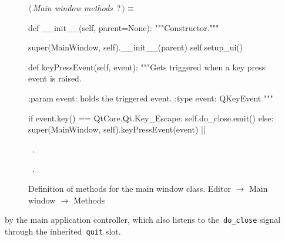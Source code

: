 \documentclass[%
    a4paper,    %
    justified,  %
    nobib,      %
    openany     %
]{tufte-book}
\begin{document}
\begin{figure}
\begin{flushleft} \small
\begin{minipage}{\linewidth}\label{scrap17}\raggedright\small
{} $\langle\,${\itshape Main window methods}\nobreak\ {\footnotesize {?}}$\,\rangle\equiv$
\vspace{-1ex}
\begin{pythoncode}
def __init__(self, parent=None):
    """Constructor."""

    super(MainWindow, self).__init__(parent)
    self.setup_ui()

def keyPressEvent(self, event):
    """Gets triggered when a key press event is raised.

    :param event: holds the triggered event.
    :type  event: QKeyEvent
    """

    if event.key() == QtCore.Qt.Key_Escape:
        self.do_close.emit()
    else:
        super(MainWindow, self).keyPressEvent(event)
|\NWsep|
\end{pythoncode}
\vspace{1.5ex}
\footnotesize
\begin{list}{}{\setlength{\itemsep}{-\parsep}\setlength{\itemindent}{-\leftmargin}}
\item \NWtxtMacroDefBy\ .
\item \NWtxtMacroRefIn\ .

\item{}
\end{list}
\end{minipage}\vspace{4ex}
\end{flushleft}
\caption{Definition of methods for the main window class.
  \newline{}\newline{}Editor $\rightarrow$ Main window $\rightarrow$ Methods}
\label{editor:lst:main-window:methods}
\end{figure}


 by the main application
controller, which also listens to the~\verb=do_close= signal through the
inherited~\verb=quit= slot.
\end{document}
